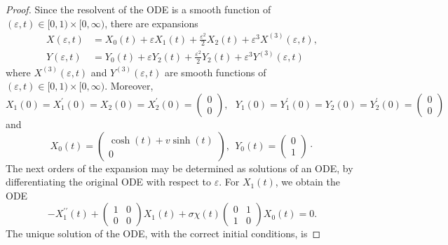 \documentclass{article}
\numberwithin{equation}{section}        %
\theoremstyle{bfnote}
\theoremstyle{definition}
\theoremstyle{bfremark}
\begin{document}
\begin{proof}
    Since the resolvent of the ODE is a smooth function of $(\varepsilon,t) \in [0,1) \times [0,\infty)$, there are expansions
    \begin{align*}
        X(\varepsilon,t) & = X_0(t) + \varepsilon X_1(t) + \frac{\varepsilon^2}{2} X_2(t) + \varepsilon^3X^{(3)}(\varepsilon,t) , \\
        Y(\varepsilon,t) & = Y_0(t) + \varepsilon Y_2(t) + \frac{\varepsilon^2}{2} Y_2(t) + \varepsilon^3Y^{(3)}(\varepsilon,t)
    \end{align*}
    where $X^{(3)}(\varepsilon,t)$ and $Y^{(3)}(\varepsilon,t)$ are smooth functions of $(\varepsilon,t) \in [0,1) \times [0,\infty)$. Moreover, 
    \begin{equation*}
        X_1(0) = X_1^\prime(0) = X_2(0) = X_2^\prime(0) = \begin{pmatrix}0 \\ 0\end{pmatrix}, ~~~ Y_1(0) = Y_1^\prime(0) = Y_2(0) = Y_2^\prime(0) = \begin{pmatrix}0 \\ 0\end{pmatrix}
    \end{equation*}
    and
    \begin{equation*}
        X_0(t) = \begin{pmatrix}
            \cosh(t) + v \sinh(t) \\
            0
        \end{pmatrix}, 
        ~~
        Y_0(t) = \begin{pmatrix}
            0 \\ 1
        \end{pmatrix} \cdot
    \end{equation*}
    The next orders of the expansion may be determined as solutions of an ODE, by differentiating the original ODE with respect to $\varepsilon$. For $X_1(t)$, we obtain the ODE
    \begin{equation*}
        - X_1^{\prime\prime}(t) + \begin{pmatrix} 1 & 0 \\ 0 & 0\end{pmatrix}X_1(t) + \sigma \chi(t) \begin{pmatrix} 0 & 1 \\ 1 & 0\end{pmatrix} X_0(t) = 0 .
    \end{equation*}
    The unique solution of the ODE, with the correct initial conditions, is

\end{proof}
\end{document}

